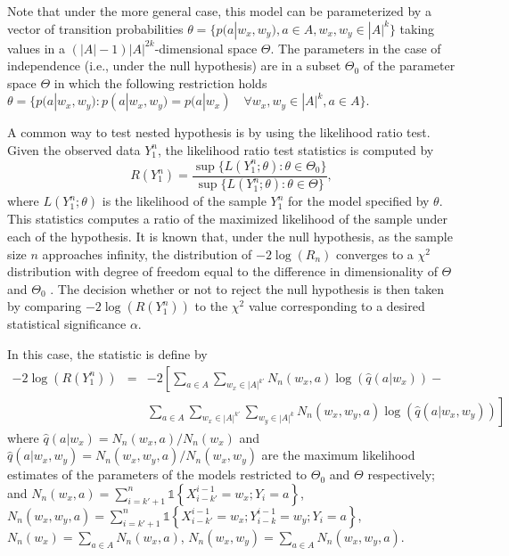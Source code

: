 \documentclass[fleqn,10pt]{wlscirep}
\begin{document}
Note that under the more general case, this model can be parameterized by a vector of transition probabilities $\theta = \{p(a|w_x,w_y), a \in A, w_x, w_y \in |A|^k\}$ taking values in a $(|A|-1)|A|^{2k}$-dimensional space $\Theta$. The parameters in the case of independence (i.e., under the null hypothesis) are in a subset $\Theta_0$ of the parameter space $\Theta$ in which the following restriction holds $\theta = \{p(a|w_x,w_y): p(a|w_x,w_y) = p(a|w_x) \quad \forall w_x, w_y \in |A|^k, a \in A \}$.

A common way to test nested hypothesis is by using the likelihood ratio test. Given the observed data $Y_1^n$, the likelihood ratio test statistics is computed by 
\begin{equation}
	R(Y_1^n) = \frac{\sup \{L(Y_1^n;\theta): \theta \in \Theta_0\}}{\sup \{L(Y_1^n;\theta): \theta \in \Theta\}},
\end{equation}
where $L(Y_1^n;\theta)$ is the likelihood of the sample $Y_1^n$ for the model specified by $\theta$. This statistics computes a ratio of the maximized likelihood of the sample under each of the hypothesis. It is known that, under the null hypothesis, as the sample size $n$ approaches infinity, the distribution of $-2\log(R_n)$ converges to a $\chi^2$ distribution with degree of freedom equal to the difference in dimensionality of $\Theta$ and $\Theta_0$ \cite{bibid}. The decision whether or not to reject the null hypothesis is then taken by comparing $-2\log(R(Y_1^n))$ to the $\chi^2$ value corresponding to a desired statistical significance $\alpha$.

In this case, the statistic is define by 
\begin{eqnarray}
	-2\log(R(Y_1^n)) &=& -2\left[\sum_{a \in A} \sum_{w_x \in |A|^{k'}} N_n(w_x,a) \log(\hat{q}(a|w_x)) - \right.\nonumber\\
	&&\left.\sum_{a \in A}\sum_{w_x \in |A|^{k'}}\sum_{w_y \in |A|^{k}} N_n(w_x,w_y,a)\log(\hat{q}(a|w_x,w_y))\right]
\end{eqnarray}
where $\hat{q}(a|w_x) = N_n(w_x,a)/	N_n(w_x)$ and $\hat{q}(a|w_x,w_y) = N_n(w_x,w_y,a)/N_n(w_x,w_y)$ are the maximum likelihood estimates of the parameters of the models restricted to $\Theta_0$ and $\Theta$ respectively; and   
$N_n(w_x,a) = \sum_{i=k'+1}^{n}\mathds{1}{\left\{X_{i-k'}^{i-1} = w_x; Y_i = a\right\}}$, $N_n(w_x,w_y,a) = \sum_{i=k'+1}^{n}\mathds{1}{\left\{X_{i-k'}^{i-1} = w_x; Y_{i-k}^{i-1} = w_y; Y_i = a\right\}}$, $N_n(w_x) = \sum_{a \in A}N_n(w_x,a)$, $N_n(w_x,w_y) = \sum_{a \in A}N_n(w_x,w_y,a)$.  
\end{document}
